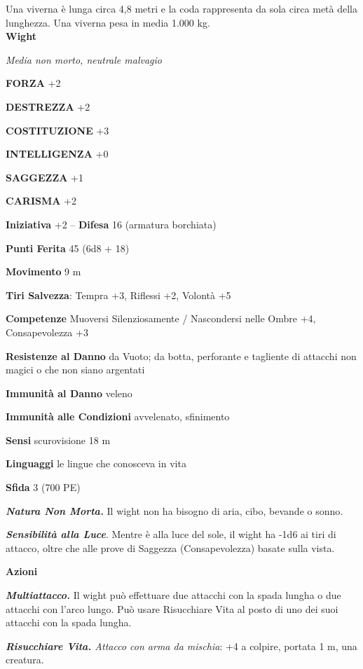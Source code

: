 \begin{multicols}{2}
Una viverna è lunga circa 4,8 metri e la coda rappresenta da sola circa metà della lunghezza. Una viverna pesa in media 1.000 kg.\\


\medskip{}\textbf{Wight}

\emph{Media non morto, neutrale malvagio}

\textbf{FORZA} +2

\textbf{DESTREZZA} +2

\textbf{COSTITUZIONE} +3

\textbf{INTELLIGENZA} +0

\textbf{SAGGEZZA} +1

\textbf{CARISMA} +2

\textbf{Iniziativa} +2 -- \textbf{Difesa} 16 (armatura borchiata)

\textbf{Punti Ferita} 45 (6d8 + 18)

\textbf{Movimento} 9 m

\textbf{Tiri Salvezza}: Tempra +3, Riflessi +2, Volontà +5

\textbf{Competenze} Muoversi Silenziosamente / Nascondersi nelle Ombre +4, Consapevolezza +3

\textbf{Resistenze al Danno} da Vuoto; da botta, perforante e tagliente di attacchi non magici o che non siano argentati

\textbf{Immunità al Danno} veleno

\textbf{Immunità alle Condizioni} avvelenato, sfinimento

\textbf{Sensi} scurovisione 18 m

\textbf{Linguaggi} le lingue che conosceva in vita

\textbf{Sfida} 3 (700 PE)

\emph{\textbf{Natura Non Morta.}} Il wight non ha bisogno di aria, cibo, bevande o sonno.

\emph{\textbf{Sensibilità alla Luce}}. Mentre è alla luce del sole, il wight ha -1d6 ai tiri di attacco, oltre che alle prove di Saggezza (Consapevolezza) basate sulla vista.

\textbf{Azioni}

\emph{\textbf{Multiattacco.}} Il wight può effettuare due attacchi con la spada lungha o due attacchi con l'arco lungo. Può usare Risucchiare Vita al posto di uno dei suoi attacchi con la spada lungha.

\emph{\textbf{Risucchiare Vita.} Attacco con arma da mischia}: +4 a colpire, portata 1 m, una creatura.


\end{multicols}
